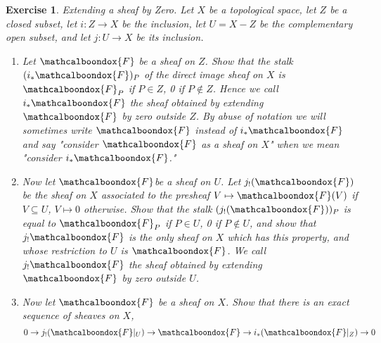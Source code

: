 \documentclass[12pt]{article}
\newtheorem{ex}{Exercise}[section]
\theoremstyle{definition}
\newcommand{\sF}{\ensuremath{\mathcalboondox{F}}}
\begin{document}
\begin{ex}
	Extending a sheaf by Zero. Let $X$ be a topological space, let $Z$ be a closed subset, let $i: Z \to X$ be the inclusion, let $U = X-Z$ be the complementary open subset, and let $j: U \to X$ be its inclusion.

	\begin{enumerate}[label=\alph*)]
		\item Let $\sF$ be a sheaf on $Z$. Show that the stalk $(i_{*} \sF)_P$ of the direct image sheaf on $X$ is $\sF_P$ if $P \in Z$, 0 if $P \notin Z$. Hence we call $i_{*} \sF$ the sheaf obtained by extending $\sF$ by zero outside $Z$. By abuse of notation we will sometimes write $\sF$ instead of $i_{*}\sF$ and say "consider $\sF$ as a sheaf on $X$" when we mean "consider $i_{*} \sF$."

		\item Now let \sF be a sheaf on $U$. Let $j_{!}(\sF)$ be the sheaf on $X$ associated to the presheaf $V \mapsto \sF(V)$ if $V \subseteq U$, $V \mapsto 0$ otherwise. Show that the stalk $(j_{!}(\sF))_P$ is equal to $\sF_P$ if $P \in U$, 0 if $P \notin U$, and show that $j_{!}\sF$ is the only sheaf on $X$ which has this property, and whose restriction to $U$ is $\sF$. We call $j_{!}\sF$ the sheaf obtained by extending $\sF$ by zero outside $U$.

		\item Now let $\sF$ be a sheaf on $X$. Show that there is an exact sequence of sheaves on $X$,
		\[
			0 \to j_{!}(\sF|_{U}) \to \sF \to i_{*}(\sF|_{Z}) \to 0
		\]
	\end{enumerate}
\end{ex}
\end{document}

